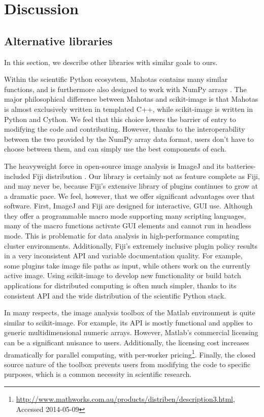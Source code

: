 
\section*{Discussion}
  \label{sec:discussion}

  \subsection*{Alternative libraries}

  In this section, we describe other libraries with similar goals to ours.
  
  Within the scientific Python ecosystem, Mahotas contains many similar
  functions, and is furthermore also designed to work with NumPy arrays
  \citep{Mahotas}. The major philosophical difference between Mahotas and
  scikit-image is that Mahotas is almost exclusively written in templated C++,
  while scikit-image is written in Python and Cython. We feel that this choice
  lowers the barrier of entry to modifying the code and contributing. However,
  thanks to the interoperability between the two provided by the NumPy array
  data format, users don't have to choose between them, and can simply use the
  best components of each.

  The heavyweight force in open-source image analysis is ImageJ and its
  batteries-included Fiji distribution \citep{Fiji}. Our library is
  certainly not as feature complete as Fiji, and may never be, because Fiji's
  extensive library of plugins continues to grow at a dramatic pace. We feel,
  however, that we offer significant advantages over that software. First,
  ImageJ and Fiji are designed for interactive, GUI use. Although they offer a
  programmable macro mode supporting many scripting languages, many of the
  macro functions activate GUI elements and cannot run in headless mode. This
  is problematic for data analysis in high-performance computing cluster
  environments. Additionally, Fiji's extremely inclusive plugin policy results
  in a very inconsistent API and variable documentation quality. For example,
  some plugins take image file paths as input, while others work on the
  currently active image. Using scikit-image to develop new functionality or
  build batch applications for distributed computing is often much simpler,
  thanks to its consistent API and the wide distribution of the scientific
  Python stack.

  In many respects, the image analysis toolbox of the Matlab environment is
  quite similar to scikit-image. For example, its API is mostly functional and
  applies to generic multidimensional numeric arrays. However, Matlab's
  commercial licensing can be a significant nuisance to users. Additionally,
  the licensing cost increases dramatically for parallel computing, with
  per-worker pricing\footnote{\url{http://www.mathworks.com.au/products/distriben/description3.html}, Accessed 2014-05-09}.
  Finally, the closed source nature of the toolbox prevents users from
  modifying the code to specific purposes, which is a common necessity in
  scientific research.
